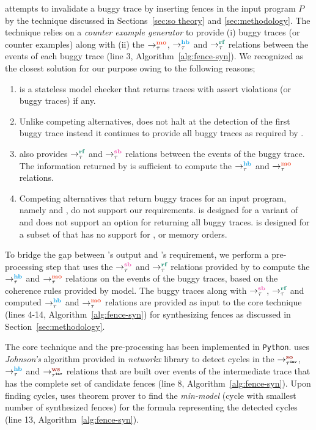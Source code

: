 \ourtechnique attempts to invalidate a buggy trace 
by inserting \cc fences in the input program $P$
by the technique discussed in Sections~\ref{sec:so theory} and
\ref{sec:methodology}.
%
The technique relies on a {\em counter example generator} to provide
(i) buggy traces (or counter examples) along with (ii)
the $\setMO$, $\setHB$ and $\setRF$ relations between the events of 
each buggy trace (line 3, Algorithm~\ref{alg:fence-syn}).
%
We recognized \cds \cite{cds} as the closest solution for our purpose
owing to the following reasons;

\begin{enumerate}
	\item \cds is a stateless model checker that returns traces 
		with assert violations (or buggy traces) if any.
	
	\item Unlike competing alternatives, \cds does not halt at the detection 
		of the first buggy trace instead it continues to provide all buggy 
		traces as required by \ourtechnique.
	
	\item \cds also provides $\setRF$ and $\setSB$ relations between the events 
		of the buggy trace. The information returned by \cds is sufficient
		to compute the $\setHB$ and $\setMO$ relations.
	
	\item Competing alternatives that return buggy traces for an input
		program, namely \genmc \cite{genmc-PLDI19} and \tracer \cite{tracer2018}, 
		do not support our requirements.
		\genmc is designed for a variant of \cc \cite{LahavVafeiadis-PLDI17} and
		does not support an option for returning all buggy traces. \tracer is
		designed for a subset of \cc that has no support for \sc, \na or \rel 
		memory orders. 
\end{enumerate}

To bridge the gap between \cds's output and \ourtechnique's requirement,
we perform a pre-processing step that uses the $\setSB$ and $\setRF$ relations 
provided by \cds to compute the $\setHB$ and $\setMO$ relations on the events
of the buggy traces, based on the coherence rules provided by \cc model.
%
The buggy traces along with $\setSB$, $\setRF$ and computed $\setHB$ 
and $\setMO$ relations are provided as input to the core technique 
(lines 4-14, Algorithm~\ref{alg:fence-syn}) for synthesizing fences as
discussed in Section~\ref{sec:methodology}.

The core technique and the pre-processing has been implemented in 
{\tt Python}.
\ourtechnique uses {\em Johnson's} algorithm provided in {\em networkx}
library to detect cycles in the $\setSO$, $\setHB$ and $\setWS$ relations 
that are built over 
events of the intermediate trace that has the complete set 
of candidate fences (line 8, Algorithm~\ref{alg:fence-syn}).
%
Upon finding cycles, \ourtechnique uses \z theorem prover to find the 
{\em min-model} (cycle with smallest number of synthesized fences) 
for the formula representing the detected cycles (line 13, 
Algorithm~\ref{alg:fence-syn}).

